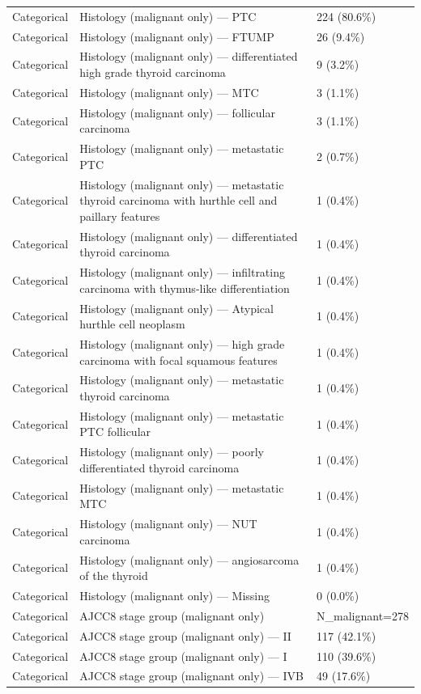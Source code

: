 \begin{table}[htbp]
\begin{tabular}{lll}
Categorical & Histology (malignant only) — PTC & 224 (80.6\%) \\
Categorical & Histology (malignant only) — FTUMP & 26 (9.4\%) \\
Categorical & Histology (malignant only) — differentiated high grade thyroid carcinoma & 9 (3.2\%) \\
Categorical & Histology (malignant only) — MTC & 3 (1.1\%) \\
Categorical & Histology (malignant only) — follicular carcinoma & 3 (1.1\%) \\
Categorical & Histology (malignant only) — metastatic PTC & 2 (0.7\%) \\
Categorical & Histology (malignant only) — metastatic thyroid carcinoma with hurthle cell and paillary features & 1 (0.4\%) \\
Categorical & Histology (malignant only) — differentiated thyroid carcinoma & 1 (0.4\%) \\
Categorical & Histology (malignant only) — infiltrating carcinoma with thymus-like differentiation & 1 (0.4\%) \\
Categorical & Histology (malignant only) — Atypical hurthle cell neoplasm & 1 (0.4\%) \\
Categorical & Histology (malignant only) — high grade carcinoma with focal squamous features & 1 (0.4\%) \\
Categorical & Histology (malignant only) — metastatic thyroid carcinoma & 1 (0.4\%) \\
Categorical & Histology (malignant only) — metastatic PTC follicular & 1 (0.4\%) \\
Categorical & Histology (malignant only) — poorly differentiated thyroid carcinoma & 1 (0.4\%) \\
Categorical & Histology (malignant only) — metastatic MTC & 1 (0.4\%) \\
Categorical & Histology (malignant only) — NUT carcinoma & 1 (0.4\%) \\
Categorical & Histology (malignant only) — angiosarcoma of the thyroid & 1 (0.4\%) \\
Categorical & Histology (malignant only) — Missing & 0 (0.0\%) \\
Categorical & AJCC8 stage group (malignant only) & N\_malignant=278 \\
Categorical & AJCC8 stage group (malignant only) — II & 117 (42.1\%) \\
Categorical & AJCC8 stage group (malignant only) — I & 110 (39.6\%) \\
Categorical & AJCC8 stage group (malignant only) — IVB & 49 (17.6\%) \\

\end{tabular}
\end{table}
